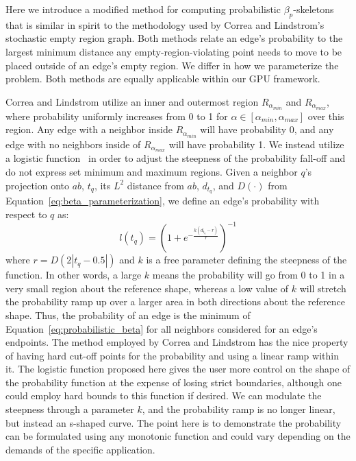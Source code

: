 Here we introduce a modified method for computing probabilistic $\beta_p$-skeletons that is similar in spirit to the methodology used by Correa and Lindstrom's stochastic empty region graph.
%
Both methods relate an edge's probability to the largest minimum distance any empty-region-violating point needs to move to be placed outside of an edge's empty region.
%
We differ in how we parameterize the problem.
%
Both methods are equally applicable within our GPU framework.

Correa and Lindstrom utilize an inner and outermost region $R_{\alpha_{min}}$ and $R_{\alpha_{max}}$, where probability uniformly increases from 0 to 1 for $\alpha \in [\alpha_{min},\alpha_{max}]$ over this region.
%
Any edge with a neighbor inside $R_{\alpha_{min}}$ will have probability 0, and any edge with no neighbors inside of $R_{\alpha_{max}}$ will have probability 1.
%
We instead utilize a logistic function~\cite{Cramer2002} in order to adjust the steepness of the probability fall-off and do not express set minimum and maximum regions.
%
Given a neighbor $q$'s projection onto $ab$, $t_q$, its $L^2$ distance from $ab$, $d_{t_q}$, and $D(\cdot)$ from Equation~\ref{eq:beta_parameterization}, we define an edge's probability with respect to $q$ as:
%
\begin{equation}
\label{eq:probabilistic_beta}
    l(t_q) = \left(1 + e^{-\frac{k\left(d_{t_q}-r\right)}{r}}\right)^{-1}
\end{equation}
%
where $r = D(2|t_q - 0.5|)$ and $k$ is a free parameter defining the steepness of the function.
%
In other words, a large $k$ means the probability will go from 0 to 1 in a very small region about the reference shape, whereas a low value of $k$ will stretch the probability ramp up over a larger area in both directions about the reference shape.
%
Thus, the probability of an edge is the minimum of Equation~\ref{eq:probabilistic_beta} for all neighbors considered for an edge's endpoints.
%
The method employed by Correa and Lindstrom has the nice property of having hard cut-off points for the probability and using a linear ramp within it.
%
The logistic function proposed here gives the user more control on the shape of the probability function at the expense of losing strict boundaries, although one could employ hard bounds to this function if desired.
%
We can modulate the steepness through a parameter $k$, and the probability ramp is no longer linear, but instead an s-shaped curve.
%
The point here is to demonstrate the probability can be formulated using any monotonic function and could vary depending on the demands of the specific application.

